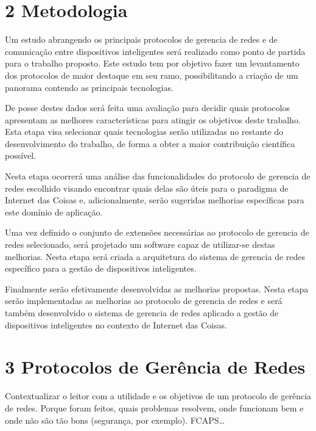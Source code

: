 \documentclass[twoside,english,brazilian]{UNISINOSmonografia}
\begin{document}
\chapter{2 Metodologia}

	Um estudo abrangendo os principais protocolos de gerencia de redes e de 
	comunicação entre dispositivos inteligentes será realizado como ponto de 
	partida para o trabalho proposto. Este estudo tem por objetivo fazer um 
	levantamento dos protocolos de maior destaque em seu ramo, possibilitando 
	a criação de um panorama contendo as principais tecnologias.
	
	De posse destes dados será feita uma avaliação para decidir quais 
	protocolos apresentam as melhores características para atingir os 
	objetivos deste trabalho. Esta etapa visa selecionar quais tecnologias 
	serão utilizadas no restante do desenvolvimento do trabalho, de forma a 
	obter a maior contribuição científica possível.
	
	Nesta etapa ocorrerá uma análise das funcionalidades do protocolo de 
	gerencia de redes escolhido visando encontrar quais delas são úteis para o 
	paradigma de Internet das Coisas e, adicionalmente, serão sugeridas 
	melhorias específicas para este domínio de aplicação.
	
	Uma vez definido o conjunto de extensões necessárias ao protocolo de 
	gerencia de redes selecionado, será projetado um software capaz de 
	utilizar-se destas melhorias. Nesta etapa será criada a arquitetura do 
	sistema de gerencia de redes específico para a gestão de dispositivos 
	inteligentes.
	
	Finalmente serão efetivamente desenvolvidas as melhorias propostas. Nesta 
	etapa serão implementadas as melhorias ao protocolo de gerencia de redes e 
	será também desenvolvido o sistema de gerencia de redes aplicado a gestão 
	de dispositivos inteligentes no contexto de Internet das Coisas.


\chapter{3 Protocolos de Gerência de Redes}


	Contextualizar o leitor com a utilidade e os objetivos de um protocolo
	de gerência de redes. Porque foram feitos, quais problemas resolvem,
	onde funcionam bem e onde não são tão bons (segurança, por exemplo).
	FCAPS\ldots
	
\end{document}
